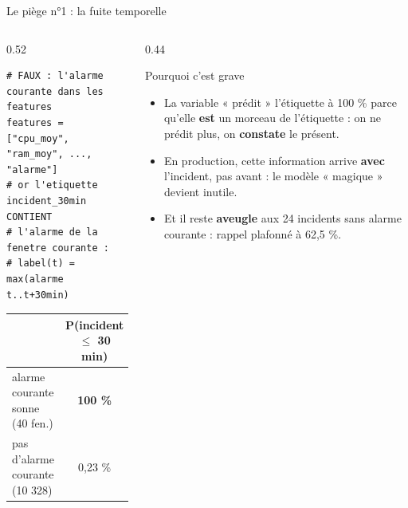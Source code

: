 \begin{frame}[fragile]{Le piège n°1 : la fuite temporelle}
\begin{columns}[t]
\begin{column}{0.52\textwidth}
\begin{lstlisting}
# FAUX : l'alarme courante dans les features
features = ["cpu_moy", "ram_moy", ..., "alarme"]
# or l'etiquette incident_30min CONTIENT
# l'alarme de la fenetre courante :
# label(t) = max(alarme t..t+30min)
\end{lstlisting}
\begin{wbox}
\small
\begin{tabular}{@{}lc@{}}
\toprule
 & P(incident $\le$ 30 min)\\
\midrule
alarme courante sonne (40 fen.) & \textbf{100 \%}\\
pas d'alarme courante (10 328) & 0,23 \%\\
\bottomrule
\end{tabular}
\end{wbox}
\end{column}
\begin{column}{0.44\textwidth}
\begin{block}{Pourquoi c'est grave}
\begin{itemize}
\item La variable « prédit » l'étiquette à 100 \% parce qu'elle
\textbf{est} un morceau de l'étiquette : on ne prédit plus, on
\textbf{constate} le présent.
\item En production, cette information arrive \textbf{avec} l'incident,
pas avant : le modèle « magique » devient inutile.
\item Et il reste \textbf{aveugle} aux 24 incidents sans alarme
courante : rappel plafonné à 62,5 \%.
\end{itemize}
\end{block}
\end{column}
\end{columns}
\end{frame}

